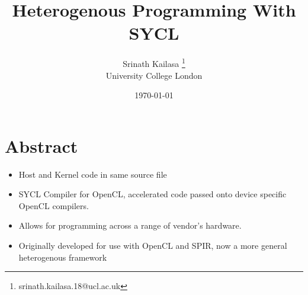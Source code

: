 \documentclass[12pt, a4, twoside]{article}
\title{Heterogenous Programming With SYCL}
\author{Srinath Kailasa \thanks{srinath.kailasa.18@ucl.ac.uk} \\ \small University College London}
\date{\today}
\begin{document}
\maketitle

\section*{Abstract}

\begin{itemize}
    \item Host and Kernel code in same source file
    \item SYCL Compiler for OpenCL, accelerated code passed onto device specific OpenCL compilers.
    \item Allows for programming across a range of vendor's hardware.
    \item Originally developed for use with OpenCL and SPIR, now a more general heterogenous framework
\end{itemize}
\end{document}
